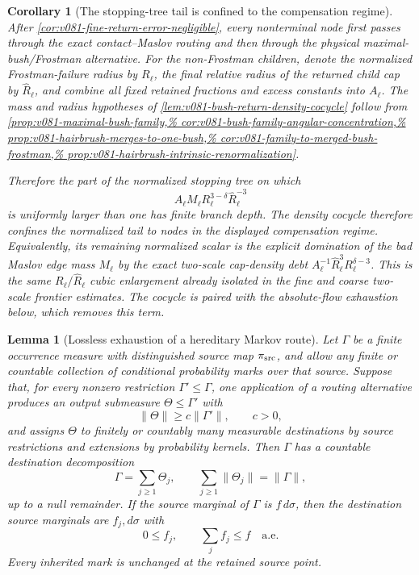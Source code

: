 \documentclass[10pt]{article}
\newtheorem{lemma}[theorem]{Lemma}
\newtheorem{corollary}[theorem]{Corollary}
\begin{document}
\begin{corollary}[The stopping-tree tail is confined to the compensation regime]
\label{cor:v081-stopping-tail-compensation}
After
\cref{cor:v081-fine-return-error-negligible}, every nonterminal node first passes through the exact
contact--Maslov routing and then through the physical maximal-bush/Frostman alternative.  For the
non-Frostman children, denote the normalized Frostman-failure radius by \(R_\ell\), the final
relative radius of the returned child cap by \(\widehat R_\ell\), and combine all fixed retained
fractions and excess constants into \(A_\ell\).  The mass and radius
hypotheses of
\cref{lem:v081-bush-return-density-cocycle} follow from
\cref{prop:v081-maximal-bush-family,%
cor:v081-bush-family-angular-concentration,%
prop:v081-hairbrush-merges-to-one-bush,%
cor:v081-family-to-merged-bush-frostman,%
prop:v081-hairbrush-intrinsic-renormalization}.

Therefore the part of the normalized stopping tree on which
\[
A_\ell M_\ell
R_\ell^{3-\delta}\widehat R_\ell^{-3}
\]
is uniformly larger than one has finite branch depth.  The density cocycle therefore confines the
normalized tail to nodes in the displayed compensation regime.  Equivalently, its remaining
normalized scalar is the explicit domination of the bad Maslov edge mass
\(M_\ell\) by the exact two-scale cap-density debt
\(A_\ell^{-1}\widehat R_\ell^3R_\ell^{\delta-3}\).  This is the same
\(R_\ell/\widehat R_\ell\) cubic enlargement already isolated in the fine and coarse two-scale
frontier estimates.  The cocycle is paired with the absolute-flow exhaustion below, which removes this term.
\end{corollary}

\begin{lemma}[Lossless exhaustion of a hereditary Markov route]
\label{lem:v081-hereditary-markov-exhaustion}
Let \(\Gamma\) be a finite occurrence measure with distinguished source map
\(\pi_{\rm src}\), and allow any finite or countable collection of conditional probability marks
over that source.  Suppose that, for every nonzero restriction \(\Gamma'\le\Gamma\), one application
of a routing alternative produces an output submeasure \(\Theta\le\Gamma'\) with
\[
 \|\Theta\|\ge c\|\Gamma'\|,
 \qquad c>0,
\]
and assigns \(\Theta\) to finitely or countably many measurable destinations by source restrictions
and extensions by probability kernels.  Then \(\Gamma\) has a countable destination decomposition
\begin{equation}
\label{eq:v081-hereditary-markov-exhaustion}
 \boxed{
 \Gamma=\sum_{j\ge1}\Theta_j,
 \qquad
 \sum_{j\ge1}\|\Theta_j\|=\|\Gamma\|,
 }
\end{equation}
up to a null remainder.  If the source marginal of \(\Gamma\) is
\(f\,d\sigma\), then the destination source marginals are
\(f_j,d\sigma\) with
\[
 0\le f_j,
 \qquad
 \sum_j f_j\le f
 \quad\text{a.e.}
\]
Every inherited mark is unchanged at the retained source point.
\end{lemma}
\end{document}
